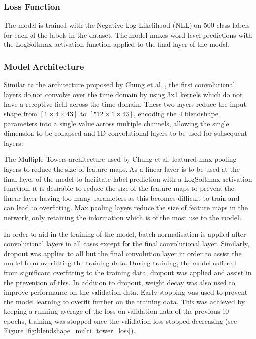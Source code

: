 \subsubsection{Loss Function}
The model is trained with the Negative Log Likelihood (NLL) on 500 class labels for each of the labels in the dataset.
The model makes word level predictions with the LogSoftmax activation function applied to the final layer of the model.

\subsubsection{Model Architecture} \label{sec:classification_model_arch}
Similar to the architecture proposed by Chung et al. \cite{Chung2016}, the first convolutional layers do not convolve over the time domain by using 3x1 kernels which do not have a receptive field across the time domain.
These two layers reduce the input shape from $[1 \times 4 \times 43]$ to $[512 \times 1 \times 43]$, encoding the 4 blendshape parameters into a single value across multiple channels, allowing the single dimension to be collapsed and 1D convolutional layers to be used for subsequent layers.

The Multiple Towers architecture used by Chung et al. featured max pooling layers to reduce the size of feature maps.
As a linear layer is to be used at the final layer of the model to facilitate label prediction with a LogSoftmax activation function, it is desirable to reduce the size of the feature maps to prevent the linear layer having too many parameters as this becomes difficult to train and can lead to overfitting.
Max pooling layers reduce the size of feature maps in the network, only retaining the information which is of the most use to the model.

In order to aid in the training of the model, batch normalisation is applied after convolutional layers in all cases except for the final convolutional layer.
Similarly, dropout was applied to all but the final convolution layer in order to assist the model from overfitting the training data.
During training, the model suffered from significant overfitting to the training data, dropout was applied and assist in the prevention of this.
In addition to dropout, weight decay was also used to improve performance on the validation data.
Early stopping was used to prevent the model learning to overfit further on the training data.
This was achieved by keeping a running average of the loss on validation data of the previous 10 epochs, training was stopped once the validation loss stopped decreasing (see Figure \ref{fig:blendshape_multi_tower_loss}).

